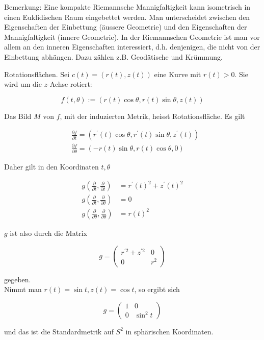 \documentclass[10pt, letterpaper]{article}
\begin{document}
Bemerkung: Eine kompakte Riemannsche Mannigfaltigkeit kann isometrisch in einen Euklidischen Raum eingebettet werden. Man unterscheidet zwischen den Eigenschaften der Einbettung (äussere Geometrie) und den Eigenschaften der Mannigfaltigkeit (innere Geometrie). In der Riemannschen Geometrie ist man vor allem an den inneren Eigenschaften interessiert, d.h. denjenigen, die nicht von der Einbettung abhängen. Dazu zählen z.B. Geodätische und Krümmung.

Rotationsflächen. Sei $c(t)=(r(t), z(t))$ eine Kurve mit $r(t)>0$. Sie wird um die $z$-Achse rotiert:

$$
f(t, \theta):=(r(t) \cos \theta, r(t) \sin \theta, z(t))
$$

Das Bild $M$ von $f$, mit der induzierten Metrik, heisst Rotationsfläche. Es gilt

$$
\begin{aligned}
& \frac{\partial f}{\partial t}=\left(r^{\prime}(t) \cos \theta, r^{\prime}(t) \sin \theta, z^{\prime}(t)\right) \\
& \frac{\partial f}{\partial \theta}=(-r(t) \sin \theta, r(t) \cos \theta, 0)
\end{aligned}
$$

Daher gilt in den Koordinaten $t, \theta$

$$
\begin{aligned}
g\left(\frac{\partial}{\partial t}, \frac{\partial}{\partial t}\right) & =r^{\prime}(t)^{2}+z^{\prime}(t)^{2} \\
g\left(\frac{\partial}{\partial t}, \frac{\partial}{\partial \theta}\right) & =0 \\
g\left(\frac{\partial}{\partial \theta}, \frac{\partial}{\partial \theta}\right) & =r(t)^{2}
\end{aligned}
$$

$g$ ist also durch die Matrix

$$
g=\left(\begin{array}{cc}
r^{\prime 2}+z^{\prime 2} & 0 \\
0 & r^{2}
\end{array}\right)
$$

gegeben.\\
Nimmt man $r(t)=\sin t, z(t)=\cos t$, so ergibt sich

$$
g=\left(\begin{array}{cc}
1 & 0 \\
0 & \sin ^{2} t
\end{array}\right)
$$

und das ist die Standardmetrik auf $S^{2}$ in sphärischen Koordinaten.
\end{document}
